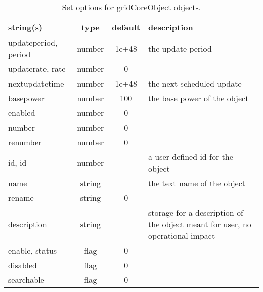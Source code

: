 \begin{table}[ht]
\centering
\begin{tabular}{p{5cm} c c p{7cm}}
\hline
string(s) & type & default & description \\
\hline
updateperiod, period & number & 1e+48 & the update period\\
updaterate, rate & number & 0 & \\
nextupdatetime & number & 1e+48 & the next scheduled update\\
basepower & number & 100 & the base power of the object\\
enabled & number & 0 & \\
number & number & 0 & \\
renumber & number & 0 & \\
id, id & number &  & a user defined id for the object\\
name & string &  & the text name of the object\\
rename & string & 0 & \\
description & string &  & storage for a description of the object meant for user, no operational impact\\
enable, status & flag & 0 & \\
disabled & flag & 0 & \\
searchable & flag & 0 & \\
\hline
\end{tabular}
\caption{Set options for gridCoreObject objects.}
\label{table:gridCoreObject}
\end{table}

